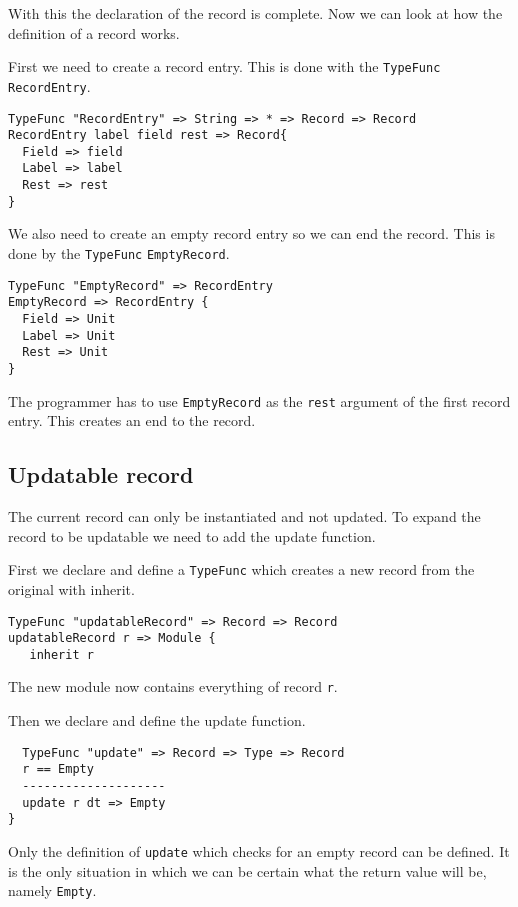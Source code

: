 With this the declaration of the record is complete.
Now we can look at how the definition of a record works.

First we need to create a record entry.
This is done with the \texttt{TypeFunc} \texttt{RecordEntry}.

\begin{lstlisting}
TypeFunc "RecordEntry" => String => * => Record => Record
RecordEntry label field rest => Record{
  Field => field
  Label => label
  Rest => rest
}
\end{lstlisting}

We also need to create an empty record entry so we can end the record.
This is done by the \texttt{TypeFunc} \texttt{EmptyRecord}.

\begin{lstlisting}
TypeFunc "EmptyRecord" => RecordEntry
EmptyRecord => RecordEntry {
  Field => Unit
  Label => Unit
  Rest => Unit
}
\end{lstlisting}

The programmer has to use \texttt{EmptyRecord} as the \texttt{rest} argument of the first record entry.
This creates an end to the record.


\subsection{Updatable record}
The current record can only be instantiated and not updated.
To expand the record to be updatable we need to add the update function.

First we declare and define a \texttt{TypeFunc} which creates a new record from the original with inherit.

\begin{lstlisting}
TypeFunc "updatableRecord" => Record => Record
updatableRecord r => Module {
   inherit r
\end{lstlisting}

The new module now contains everything of record \texttt{r}.

Then we declare and define the update function.

\begin{lstlisting}
  TypeFunc "update" => Record => Type => Record
  r == Empty
  --------------------
  update r dt => Empty
}
\end{lstlisting}

Only the definition of \texttt{update} which checks for an empty record can be defined.
It is the only situation in which we can be certain what the return value will be, namely \texttt{Empty}.

